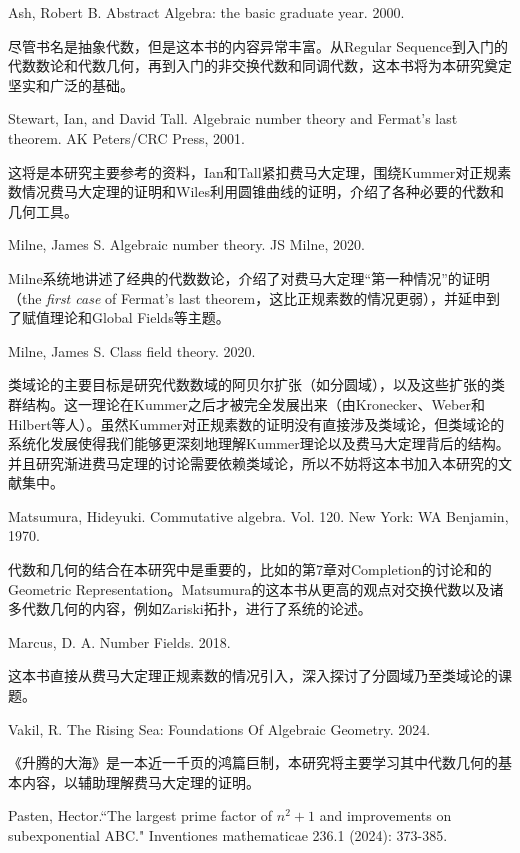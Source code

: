 \documentclass{article}
\begin{document}
\begin{thebibliography}{99}

Ash, Robert B. Abstract Algebra: the basic graduate year. 2000.

尽管书名是抽象代数，但是这本书的内容异常丰富。从Regular Sequence到入门的代数数论和代数几何，再到入门的非交换代数和同调代数，这本书将为本研究奠定坚实和广泛的基础。

Stewart, Ian, and David Tall. Algebraic number theory and Fermat's last theorem. AK Peters/CRC Press, 2001.

这将是本研究主要参考的资料，Ian和Tall紧扣费马大定理，围绕Kummer对正规素数情况费马大定理的证明和Wiles利用圆锥曲线的证明，介绍了各种必要的代数和几何工具。

Milne, James S. Algebraic number theory. JS Milne, 2020.

Milne系统地讲述了经典的代数数论，介绍了对费马大定理“第一种情况”的证明（the \textit{first case} of Fermat's last theorem，这比正规素数的情况更弱），并延申到了赋值理论和Global Fields等主题。

Milne, James S. Class field theory. 2020.

类域论的主要目标是研究代数数域的阿贝尔扩张（如分圆域），以及这些扩张的类群结构。这一理论在Kummer之后才被完全发展出来（由Kronecker、Weber和Hilbert等人）。虽然Kummer对正规素数的证明没有直接涉及类域论，但类域论的系统化发展使得我们能够更深刻地理解Kummer理论以及费马大定理背后的结构。并且研究渐进费马定理的讨论需要依赖类域论，所以不妨将这本书加入本研究的文献集中。

Matsumura, Hideyuki. Commutative algebra. Vol. 120. New York: WA Benjamin, 1970.

代数和几何的结合在本研究中是重要的，比如\cite{ref3}的第7章对Completion的讨论和\cite{ref2}的Geometric Representation。Matsumura的这本书从更高的观点对交换代数以及诸多代数几何的内容，例如Zariski拓扑，进行了系统的论述。

Marcus, D. A. Number Fields. 2018.

这本书直接从费马大定理正规素数的情况引入，深入探讨了分圆域乃至类域论的课题。

Vakil, R. The Rising Sea: Foundations Of Algebraic Geometry. 2024.

《升腾的大海》是一本近一千页的鸿篇巨制，本研究将主要学习其中代数几何的基本内容，以辅助理解费马大定理的证明。

Pasten, Hector.``The largest prime factor of $n^2+ 1$ and improvements on subexponential ABC." Inventiones mathematicae 236.1 (2024): 373-385.


\end{thebibliography}
\end{document}
